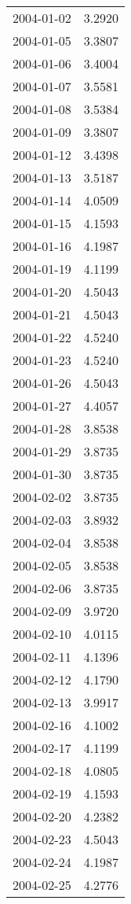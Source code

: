 \begin{tabular}{lr}
2004-01-02 &      3.2920 \\
2004-01-05 &      3.3807 \\
2004-01-06 &      3.4004 \\
2004-01-07 &      3.5581 \\
2004-01-08 &      3.5384 \\
2004-01-09 &      3.3807 \\
2004-01-12 &      3.4398 \\
2004-01-13 &      3.5187 \\
2004-01-14 &      4.0509 \\
2004-01-15 &      4.1593 \\
2004-01-16 &      4.1987 \\
2004-01-19 &      4.1199 \\
2004-01-20 &      4.5043 \\
2004-01-21 &      4.5043 \\
2004-01-22 &      4.5240 \\
2004-01-23 &      4.5240 \\
2004-01-26 &      4.5043 \\
2004-01-27 &      4.4057 \\
2004-01-28 &      3.8538 \\
2004-01-29 &      3.8735 \\
2004-01-30 &      3.8735 \\
2004-02-02 &      3.8735 \\
2004-02-03 &      3.8932 \\
2004-02-04 &      3.8538 \\
2004-02-05 &      3.8538 \\
2004-02-06 &      3.8735 \\
2004-02-09 &      3.9720 \\
2004-02-10 &      4.0115 \\
2004-02-11 &      4.1396 \\
2004-02-12 &      4.1790 \\
2004-02-13 &      3.9917 \\
2004-02-16 &      4.1002 \\
2004-02-17 &      4.1199 \\
2004-02-18 &      4.0805 \\
2004-02-19 &      4.1593 \\
2004-02-20 &      4.2382 \\
2004-02-23 &      4.5043 \\
2004-02-24 &      4.1987 \\
2004-02-25 &      4.2776 \\

\end{tabular}
